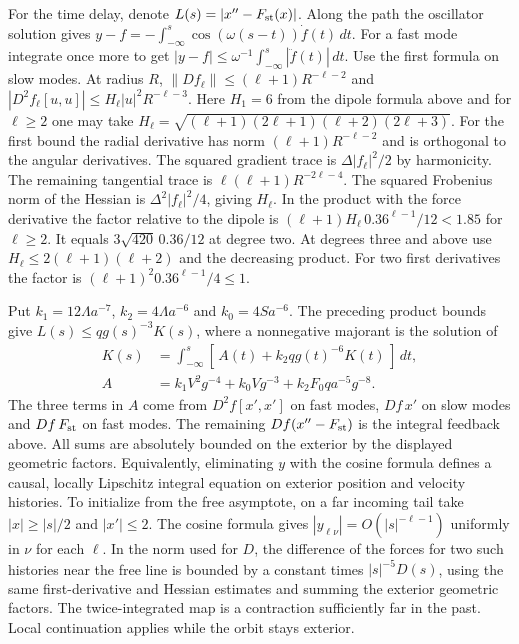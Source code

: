 \documentclass[11pt,a4paper]{article}
\begin{document}
For the time delay, denote \(L(s)=|x''-F_{\rm st}(x)|\). Along the path
the oscillator solution gives \(y-f=-\int_{-\infty}^s
\cos(\omega(s-t))\dot f(t)\,dt\). For a fast mode integrate once more to
get \(|y-f|\le\omega^{-1}\int_{-\infty}^s|\ddot f(t)|\,dt\). Use the
first formula on slow modes. At radius \(R\),
\(\|Df_\ell\|\le(\ell+1)R^{-\ell-2}\) and
\(|D^2f_\ell[u,u]|\le H_\ell |u|^2R^{-\ell-3}\). Here \(H_1=6\) from the
dipole formula above and for \(\ell\ge2\) one may take
\(H_\ell=\sqrt{(\ell+1)(2\ell+1)(\ell+2)(2\ell+3)}\). For the first
bound the radial derivative has norm \((\ell+1)R^{-\ell-2}\) and is
orthogonal to the angular derivatives. The squared gradient trace is
\(\Delta |f_\ell|^2/2\) by harmonicity. The remaining tangential trace
is \(\ell(\ell+1)R^{-2\ell-4}\). The squared Frobenius norm of the
Hessian is \(\Delta^2|f_\ell|^2/4\), giving \(H_\ell\). In the product
with the force derivative the factor relative to the dipole is
\((\ell+1)H_\ell\,0.36^{\ell-1}/12<1.85\) for \(\ell\ge2\). It equals
\(3\sqrt{420}\,0.36/12\) at degree two. At degrees three and above use
\(H_\ell\le2(\ell+1)(\ell+2)\) and the decreasing product. For two first
derivatives the factor is \((\ell+1)^2
0.36^{\ell-1}/4\le1\).

Put \(k_1=12\Lambda a^{-7}\), \(k_2=4\Lambda a^{-6}\) and
\(k_0=4S a^{-6}\). The preceding product bounds give
\(L(s)\le qg(s)^{-3}K(s)\), where a nonnegative majorant is the solution
of \[
 \begin{aligned}
 K(s)&=\int_{-\infty}^s [\,A(t)+k_2qg(t)^{-6}K(t)\,]\,dt,\\
 A&=k_1V^2g^{-4}+k_0Vg^{-3}+k_2 F_0 q a^{-5}g^{-8}.
 \end{aligned}
\] The three terms in \(A\) come from \(D^2f[x',x']\) on fast modes,
\(Df\,x'\) on slow modes and \(Df\,F_{\rm st}\) on fast modes. The
remaining \(Df(x''-F_{\rm st})\) is the integral feedback above. All
sums are absolutely bounded on the exterior by the displayed geometric
factors. Equivalently, eliminating \(y\) with the cosine formula defines
a causal, locally Lipschitz integral equation on exterior position and
velocity histories. To initialize from the free asymptote, on a far
incoming tail take \(|x|\ge |s|/2\) and \(|x'|\le2\). The cosine formula
gives \(|y_{\ell\nu}|=O(|s|^{-\ell-1})\) uniformly in \(\nu\) for each
\(\ell\). In the norm used for \(D\), the difference of the forces for
two such histories near the free line is bounded by a constant times
\(|s|^{-5}D(s)\), using the same first-derivative and Hessian estimates
and summing the exterior geometric factors. The twice-integrated map is
a contraction sufficiently far in the past. Local continuation applies
while the orbit stays exterior.
\end{document}
